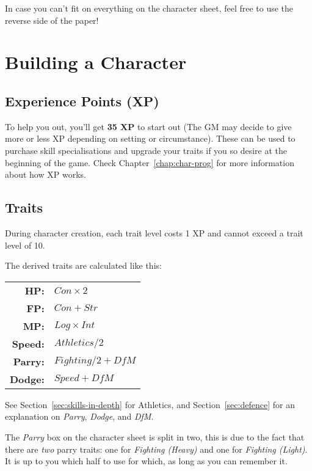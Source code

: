 \begin{note} 
    In case you can't fit on everything on the character sheet, feel free to use the reverse side of the paper!
\end{note}

\section{Building a Character}
\subsection{Experience Points (XP)}
To help you out, you'll get \textbf{35 XP} to start out (The GM may decide to give more or less XP depending on setting or circumstance).
These can be used to purchase skill specialisations and upgrade your traits if you so desire at the beginning of the game.
Check Chapter~\ref{chap:char-prog} for more information about how XP works.

\subsection{Traits}
During character creation, each trait level costs 1 XP and cannot exceed a trait level of 10.

The derived traits are calculated like this:
\begin{center}
\begin{tabular} {r | l} 
\textbf{HP:} & $Con \times 2$ \\
\textbf{FP:} & $Con + Str$ \\
\textbf{MP:} & $Log \times Int$ \\
\textbf{Speed:} & $Athletics / 2$\\
\textbf{Parry:} & $Fighting / 2 + \mathit{DfM}$\\
\textbf{Dodge:} & $Speed + \mathit{DfM}$ \\
\end{tabular}
\end{center}
See Section~\ref{sec:skills-in-depth} for Athletics, and Section~\ref{sec:defence} for an explanation on \textit{Parry}, \textit{Dodge}, and \textit{DfM}.

\begin{note} 
    The \textit{Parry} box on the character sheet is split in two, this is due to the fact that there are \textit{two} parry traits: one for \textit{Fighting (Heavy)} and one for \textit{Fighting (Light)}.
    It is up to you which half to use for which, as long as you can remember it.
\end{note}

